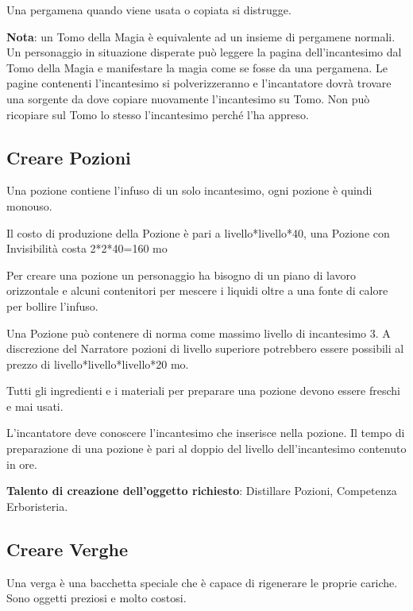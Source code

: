 \begin{multicols}{2}
Una pergamena quando viene usata o copiata si distrugge.

\textbf{Nota}: un Tomo della Magia è equivalente ad un insieme di pergamene normali. Un personaggio in situazione disperate può leggere la pagina dell'incantesimo dal Tomo della Magia e manifestare la magia come se fosse da una pergamena. Le pagine contenenti l'incantesimo si polverizzeranno e l'incantatore dovrà trovare una sorgente da dove copiare nuovamente l'incantesimo su Tomo. Non può ricopiare sul Tomo lo stesso l'incantesimo perché l'ha appreso. 

\subsection{Creare Pozioni}\label{crearepozioni}\hypertarget{crearepozioni}{}

Una pozione contiene l'infuso di un solo incantesimo, ogni pozione è quindi monouso.

\medskip

Il costo di produzione della Pozione è pari a livello*livello*40, una Pozione con Invisibilità costa 2*2*40=160 mo

\medskip

Per creare una pozione un personaggio ha bisogno di un piano di lavoro orizzontale e alcuni contenitori per mescere i liquidi oltre a una fonte di calore per bollire l'infuso.

Una Pozione può contenere di norma come massimo livello di incantesimo 3. A discrezione del Narratore pozioni di livello superiore potrebbero essere possibili al prezzo di livello*livello*livello*20 mo.

Tutti gli ingredienti e i materiali per preparare una pozione devono essere freschi e mai usati.

L'incantatore deve conoscere l'incantesimo che inserisce nella pozione. Il tempo di preparazione di una pozione è pari al doppio del livello dell'incantesimo contenuto in ore.

\textbf{Talento di creazione dell'oggetto richiesto}: Distillare Pozioni, Competenza Erboristeria.

\subsection{Creare Verghe}\label{creareverghe}

Una verga è una bacchetta speciale che è capace di rigenerare le proprie cariche. Sono oggetti preziosi e molto costosi.


\end{multicols}
